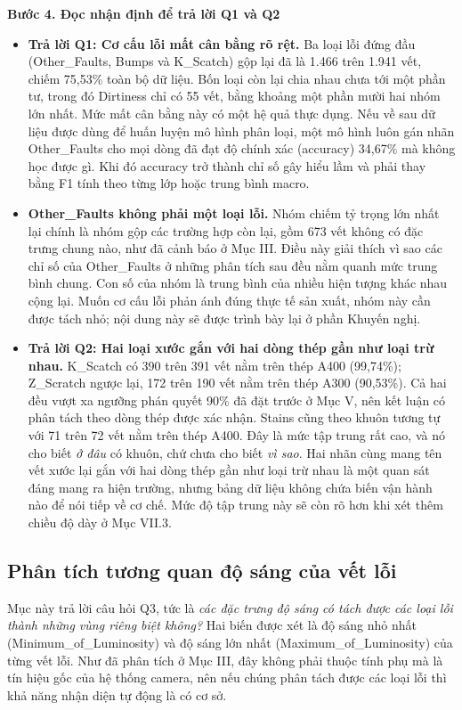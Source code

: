 \documentclass[12pt]{article}
\begin{document}
\noindent
\textbf{Bước 4. Đọc nhận định để trả lời Q1 và Q2}

\begin{itemize}
    \item \textbf{Trả lời Q1: Cơ cấu lỗi mất cân bằng rõ rệt.} Ba loại lỗi đứng đầu (Other\_Faults, Bumps và K\_Scatch) gộp lại đã là 1.466 trên 1.941 vết, chiếm 75,53\% toàn bộ dữ liệu. Bốn loại còn lại chia nhau chưa tới một phần tư, trong đó Dirtiness chỉ có 55 vết, bằng khoảng một phần mười hai nhóm lớn nhất. Mức mất cân bằng này có một hệ quả thực dụng. Nếu về sau dữ liệu được dùng để huấn luyện mô hình phân loại, một mô hình luôn gán nhãn Other\_Faults cho mọi dòng đã đạt độ chính xác (accuracy) 34,67\% mà không học được gì. Khi đó accuracy trở thành chỉ số gây hiểu lầm và phải thay bằng F1 tính theo từng lớp hoặc trung bình macro.

    \item \textbf{Other\_Faults không phải một loại lỗi.} Nhóm chiếm tỷ trọng lớn nhất lại chính là nhóm gộp các trường hợp còn lại, gồm 673 vết không có đặc trưng chung nào, như đã cảnh báo ở Mục III. Điều này giải thích vì sao các chỉ số của Other\_Faults ở những phân tích sau đều nằm quanh mức trung bình chung. Con số của nhóm là trung bình của nhiều hiện tượng khác nhau cộng lại. Muốn cơ cấu lỗi phản ánh đúng thực tế sản xuất, nhóm này cần được tách nhỏ; nội dung này sẽ được trình bày lại ở phần Khuyến nghị.

    \item \textbf{Trả lời Q2: Hai loại xước gắn với hai dòng thép gần như loại trừ nhau.} K\_Scatch có 390 trên 391 vết nằm trên thép A400 (99,74\%); Z\_Scratch ngược lại, 172 trên 190 vết nằm trên thép A300 (90,53\%). Cả hai đều vượt xa ngưỡng phán quyết 90\% đã đặt trước ở Mục V, nên kết luận có phân tách theo dòng thép được xác nhận. Stains cũng theo khuôn tương tự với 71 trên 72 vết nằm trên thép A400. Đây là mức tập trung rất cao, và nó cho biết \emph{ở đâu} có khuôn, chứ chưa cho biết \emph{vì sao}. Hai nhãn cùng mang tên vết xước lại gắn với hai dòng thép gần như loại trừ nhau là một quan sát đáng mang ra hiện trường, nhưng bảng dữ liệu không chứa biến vận hành nào để nói tiếp về cơ chế. Mức độ tập trung này sẽ còn rõ hơn khi xét thêm chiều độ dày ở Mục VII.3.

\end{itemize}

\subsection{Phân tích tương quan độ sáng của vết lỗi}
Mục này trả lời câu hỏi Q3, tức là \emph{các đặc trưng độ sáng có tách được các loại lỗi thành những vùng riêng biệt không?} Hai biến được xét là độ sáng nhỏ nhất (Minimum\_of\_Luminosity) và độ sáng lớn nhất (Maximum\_of\_Luminosity) của từng vết lỗi. Như đã phân tích ở Mục III, đây không phải thuộc tính phụ mà là tín hiệu gốc của hệ thống camera, nên nếu chúng phân tách được các loại lỗi thì khả năng nhận diện tự động là có cơ sở.\medskip
\end{document}
